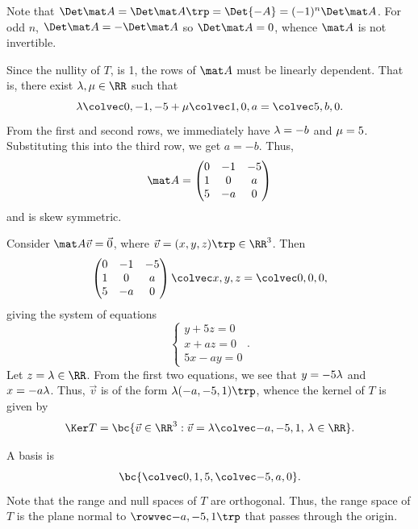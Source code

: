 \begin{solution}
    \begin{ppart}
        Note that $\Det \mat A = \Det \mat A \trp = \Det{-A} = (-1)^n \Det \mat A$. For odd $n$, $\Det \mat A = -\Det \mat A$ so $\Det \mat A = 0$, whence $\mat A$ is not invertible.
    \end{ppart}
    \begin{ppart}
        \begin{psubpart}
            Since the nullity of $T$, is 1, the rows of $\mat A$ must be linearly dependent. That is, there exist $\l, \m \in \RR$ such that \[\l \cveciii0{-1}{-5} + \m \cveciii10a = \cveciii5b0.\] From the first and second rows, we immediately have $\lambda = -b$ and $\mu = 5$. Substituting this into the third row, we get $a = -b$. Thus, \[\mat A = \begin{pmatrix}0 & -1 & -5 \\ 1 & 0 & a \\ 5 & -a & 0\end{pmatrix}\] and is skew symmetric.
        \end{psubpart}
        \begin{psubpart}
            Consider $\mat A \vec v = \vec 0$, where $\vec v = (x, y, z)\trp \in \RR^3$. Then \[\begin{pmatrix}0 & -1 & -5 \\ 1 & 0 & a \\ 5 & -a & 0\end{pmatrix} \cveciii{x}{y}{z} = \cveciii000,\] giving the system of equations \[\left\{\begin{aligned}y + 5z = 0 \\ x + az = 0 \\ 5x-ay = 0\end{aligned}\right..\] Let $z = \l \in \RR$. From the first two equations, we see that $y = -5\lambda$ and $x = -a\lambda$. Thus, $\vec v$ is of the form $\l (-a, -5, 1)\trp$, whence the kernel of $T$ is given by \[\Ker T = \bc{\vec v \in \RR^3 : \vec v = \l \cveciii{-a}{-5}{1}, \, \l \in \RR}.\]
        \end{psubpart}
        \begin{psubpart}
            A basis is \[\bc{\cveciii015, \cveciii{-5}{a}{0}}.\] Note that the range and null spaces of $T$ are orthogonal. Thus, the range space of $T$ is the plane normal to $\cveciiix{-a}{-5}{1}$ that passes through the origin.
        \end{psubpart}
    \end{ppart}
\end{solution}

